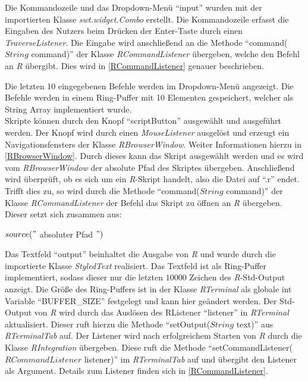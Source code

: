 \documentclass[a4paper, 12pt]{report} %
\begin{document}
Die Kommandozeile und das Dropdown-Menü "`input"' wurden mit der importierten Klasse \textit{swt.widget.Combo} erstellt. Die Kommandozeile erfasst die Eingaben des Nutzers beim Drücken der Enter-Taste durch einen \textit{TraverseListener}. Die Eingabe wird anschließend an die Methode "`command($String$ command)"' der Klasse  \textit{RCommandListener} übergeben, welche den Befehl an \textit{R} übergibt. Dies wird in \ref{RCommandListener} genauer beschrieben.

Die letzten 10 eingegebenen Befehle werden im Dropdown-Menü angezeigt. Die Befehle werden in einem Ring-Puffer mit 10 Elementen gespeichert, welcher als String Array implementiert wurde.\\

Skripte können durch den Knopf "`scriptButton"' ausgewählt und ausgeführt werden. Der Knopf wird durch einen \textit{MouseListener} ausgelöst und erzeugt ein Navigationsfensters der Klasse \textit{RBrowserWindow}. Weiter Informationen hierzu in \ref{RBrowserWindow}. Durch dieses kann das Skript ausgewählt werden und es wird vom \textit{RBrowserWindow} der absolute Pfad des Skriptes übergeben. Anschließend wird überprüft, ob es sich um ein \textit{R}-Skript handelt, also die Datei auf "`.r"' endet. Trifft dies zu, so wird durch die Methode "`command($String$ command)"' der Klasse  \textit{RCommandListener} der Befehl das Skript zu öffnen an \textit{R} übergeben. Dieser setzt sich zusammen aus:
\begin{center}
$source("$  absoluter Pfad $")$
\end{center}

Das Textfeld "`output"' beinhaltet die Ausgabe von \textit{R} und wurde durch die importierte Klasse \textit{StyledText} realisiert. Das Textfeld ist als Ring-Puffer implementiert, sodass dieser nur die letzten $10000$ Zeichen des \textit{R}-Std-Output anzeigt. Die Größe des Ring-Puffers ist in der Klasse \textit{RTerminal} als globale int Variable "`BUFFER\_SIZE"' festgelegt und kann hier geändert werden.
Der Std-Output von \textit{R} wird durch das Auslösen des RListener "`listener"' in \textit{RTerminal} aktualisiert. Dieser ruft hierzu die Methode "`setOutput($String$ text)"' aus \textit{RTerminalTab} auf. Der Listener wird nach erfolgreichem Starten von \textit{R} durch die Klasse \textit{RIntegration} übergeben. Diese ruft die Methode "`setCommandListener($RCommandListener$ listener)"' im \textit{RTerminalTab} auf und übergibt den Listener als Argument. Details zum Listener finden sich in \ref{RCommandListener}.\\
\end{document}
